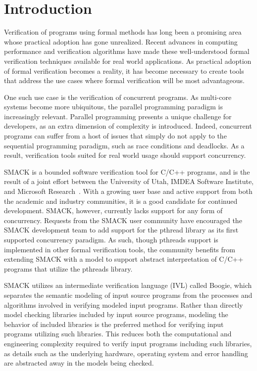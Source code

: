 \chapter{Introduction}\label{thesis_intro}

Verification of programs using formal methods has long been a
promising area whose practical adoption has gone unrealized.  Recent
advances in computing performance and verification algorithms have
made these well-understood formal verification techniques available
for real world applications.  As practical adoption of formal
verification becomes a reality, it has become necessary to create
tools that address the use cases where formal verification will
be most advantageous. 

One such use case is the verification of concurrent programs.  As
multi-core systems become more ubiquitous, the parallel programming
paradigm is increasingly relevant.  Parallel programming presents a
unique challenge for developers, as an extra dimension of complexity
is introduced.  Indeed, concurrent programs can suffer from a host of
issues that simply do not apply to the sequential programming
paradigm, such as race conditions and deadlocks.  As a result,
verification tools suited for real world usage should support
concurrency.

SMACK is a bounded software verification tool for C/C++ programs, and
is the result of a joint effort between the University of Utah, IMDEA
Software Institute, and Microsoft Research~\cite{smack}.  With a
growing user base and active support from both the academic and
industry communities, it is a good candidate for continued
development.  SMACK, however, currently lacks support for any form of
concurrency.  Requests from the SMACK user community have encouraged
the SMACK development team to add support for the pthread library as
its first supported concurrency paradigm.   As such, though pthreads
support is implemented in other formal verification tools, the
community benefits from extending SMACK with a model to support
abstract interpretation of C/C++ programs that utilize the pthreads
library.  

SMACK utilizes an intermediate verification language (IVL) called
Boogie, which separates the semantic modeling of input source programs
from the processes and algorithms involved in verifying modeled input
programs.  Rather than directly model checking libraries included by
input source programs, modeling the behavior of included libraries is
the preferred method for verifying input programs utilizing such
libraries.  This reduces both the computational and engineering
complexity required to verify input programs including such libraries,
as details such as the underlying hardware, operating system and error
handling are abstracted away in the models being checked.

